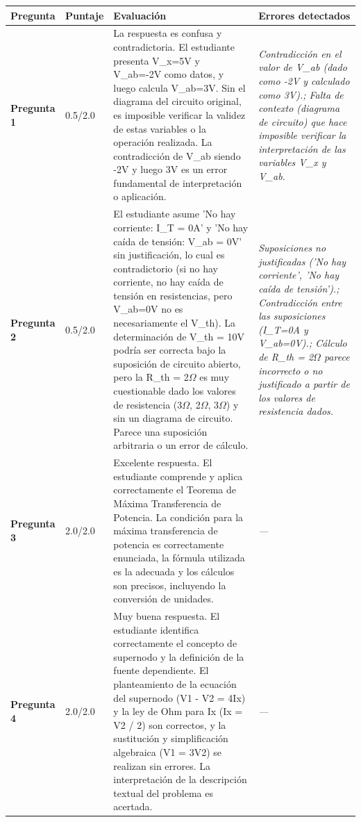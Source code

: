 \documentclass[11pt,a4paper]{article}
\begin{document}
\begin{longtable}{>{\bfseries}p{2.8cm} p{1.6cm} p{7.0cm} p{2.8cm}}
  \toprule
  \textbf{Pregunta} & \textbf{Puntaje} & \textbf{Evaluación} & \textbf{Errores detectados} \\
  \midrule
  \endhead
  \bottomrule
  \endfoot
    \textbf{Pregunta 1} & 0.5/2.0 & La respuesta es confusa y contradictoria. El estudiante presenta V\_x=5V y V\_ab=-2V como datos, y luego calcula V\_ab=3V. Sin el diagrama del circuito original, es imposible verificar la validez de estas variables o la operación realizada. La contradicción de V\_ab siendo -2V y luego 3V es un error fundamental de interpretación o aplicación. & \textit{Contradicción en el valor de V\_ab (dado como -2V y calculado como 3V).; Falta de contexto (diagrama de circuito) que hace imposible verificar la interpretación de las variables V\_x y V\_ab.} \\
    \midrule
    \textbf{Pregunta 2} & 0.5/2.0 & El estudiante asume 'No hay corriente: I\_T = 0A' y 'No hay caída de tensión: V\_ab = 0V' sin justificación, lo cual es contradictorio (si no hay corriente, no hay caída de tensión en resistencias, pero V\_ab=0V no es necesariamente el V\_th). La determinación de V\_th = 10V podría ser correcta bajo la suposición de circuito abierto, pero la R\_th = 2$\Omega$ es muy cuestionable dado los valores de resistencia (3$\Omega$, 2$\Omega$, 3$\Omega$) y sin un diagrama de circuito. Parece una suposición arbitraria o un error de cálculo. & \textit{Suposiciones no justificadas ('No hay corriente', 'No hay caída de tensión').; Contradicción entre las suposiciones (I\_T=0A y V\_ab=0V).; Cálculo de R\_th = 2$\Omega$ parece incorrecto o no justificado a partir de los valores de resistencia dados.} \\
    \midrule
    \textbf{Pregunta 3} & 2.0/2.0 & Excelente respuesta. El estudiante comprende y aplica correctamente el Teorema de Máxima Transferencia de Potencia. La condición para la máxima transferencia de potencia es correctamente enunciada, la fórmula utilizada es la adecuada y los cálculos son precisos, incluyendo la conversión de unidades. & \textit{---} \\
    \midrule
    \textbf{Pregunta 4} & 2.0/2.0 & Muy buena respuesta. El estudiante identifica correctamente el concepto de supernodo y la definición de la fuente dependiente. El planteamiento de la ecuación del supernodo (V1 - V2 = 4Ix) y la ley de Ohm para Ix (Ix = V2 / 2) son correctos, y la sustitución y simplificación algebraica (V1 = 3V2) se realizan sin errores. La interpretación de la descripción textual del problema es acertada. & \textit{---} \\

\end{longtable}
\end{document}
